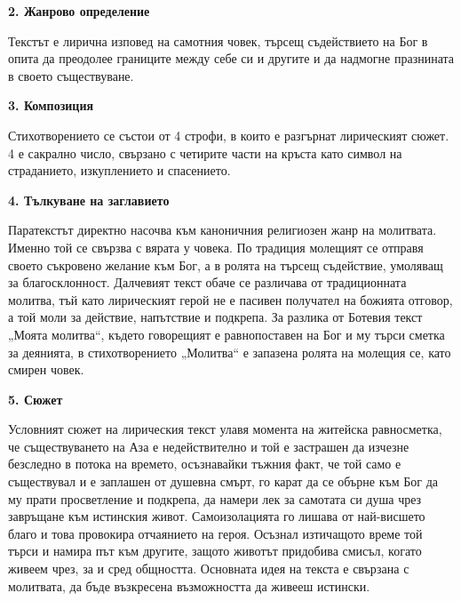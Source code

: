 \documentclass[12pt,a4paper]{article}
\begin{document}
\noindent 
\textbf{2. Жанрово определение}
\vspace{0.1cm}
 
\indent Текстът е лирична изповед на самотния човек, търсещ съдействието на Бог в опита да преодолее границите между себе си и другите и да надмогне празнината в своето съществуване. 

\vspace{0.1cm}

\noindent 
\textbf{3. Композиция}
\vspace{0.1cm}
 
\indent Стихотворението се състои от 4 строфи, в които е разгърнат лирическият сюжет. 4 е сакрално число, свързано с четирите части на кръста като символ на страданието, изкуплението и спасението. 

\vspace{0.1cm}
 
\noindent 
\textbf{4. Тълкуване на заглавието}
\vspace{0.1cm}
 
\indent Паратекстът директно насочва към каноничния религиозен жанр на молитвата. Именно той се свързва с вярата у човека. По традиция молещият се отправя своето съкровено желание към Бог, а в ролята на търсещ съдействие, умоляващ за благосклонност. Далчевият текст обаче се различава от традиционната молитва, тъй като лирическият герой не е пасивен получател на божията отговор, а той моли за действие, напътствие и подкрепа. За разлика от Ботевия текст „Моята молитва“, където говорещият е равнопоставен на Бог и му търси сметка за деянията, в стихотворението „Молитва“ е запазена ролята на молещия се, като смирен човек.

\vspace{0.1cm}
 
\noindent 
\textbf{5. Сюжет}
\vspace{0.1cm}
 
\indent Условният сюжет на лирическия текст улавя момента на житейска равносметка, че съществуването на Аза е недействително и той е застрашен да изчезне безследно в потока на времето, осъзнавайки тъжния факт, че той само е съществувал и е заплашен от душевна смърт, го карат да се обърне към Бог да му прати просветление и подкрепа, да намери лек за самотата си душа чрез завръщане към истинския живот. Самоизолацията го лишава от най-висшето благо и това провокира отчаянието на героя. Осъзнал изтичащото време той търси и намира път към другите, защото животът придобива смисъл, когато живеем чрез, за и сред общността. Основната идея на текста е свързана с молитвата, да бъде възкресена възможността да живееш истински.
\end{document}

